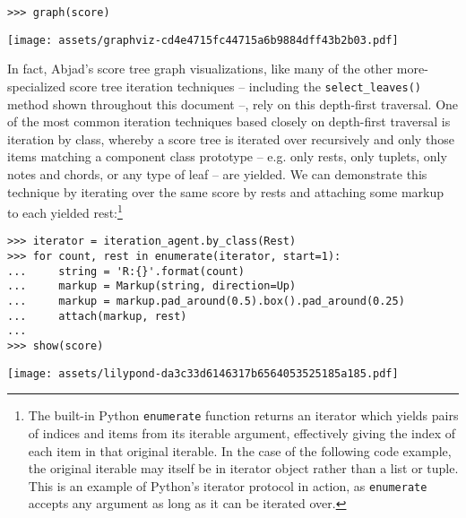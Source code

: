 \begin{comment}
<abjad>
graph(score)
</abjad>
\end{comment}

\begin{abjadbookoutput}
\begin{singlespacing}
\vspace{-0.5\baselineskip}
\begin{verbatim}
>>> graph(score)
\end{verbatim}
\noindent\texttt{[image: assets/graphviz-cd4e4715fc44715a6b9884dff43b2b03.pdf]}
\end{singlespacing}
\end{abjadbookoutput}

\noindent In fact, Abjad's score tree graph visualizations, like many of the
other more-specialized score tree iteration techniques -- including the
\texttt{select\_leaves()} method shown throughout this document --, rely on
this depth-first traversal. One of the most common iteration techniques based
closely on depth-first traversal is iteration by class, whereby a score tree is
iterated over recursively and only those items matching a component class
prototype -- e.g. only rests, only tuplets, only notes and chords, or any type
of leaf -- are yielded. We can demonstrate this technique by iterating over the
same score by rests and attaching some markup to each yielded rest:\footnote{
The built-in Python \texttt{enumerate} function returns an iterator which
yields pairs of indices and items from its iterable argument, effectively
giving the index of each item in that original iterable. In the case of the
following code example, the original iterable may itself be in iterator object
rather than a list or tuple. This is an example of Python's iterator protocol
in action, as \texttt{enumerate} accepts any argument as long as it can be
iterated over.}

\begin{comment}
<abjad>
iterator = iteration_agent.by_class(Rest)
for count, rest in enumerate(iterator, start=1):
    string = 'R:{}'.format(count)
    markup = Markup(string, direction=Up)
    markup = markup.pad_around(0.5).box().pad_around(0.25)
    attach(markup, rest)

show(score)
</abjad>
\end{comment}

\begin{abjadbookoutput}
\begin{singlespacing}
\vspace{-0.5\baselineskip}
\begin{verbatim}
>>> iterator = iteration_agent.by_class(Rest)
>>> for count, rest in enumerate(iterator, start=1):
...     string = 'R:{}'.format(count)
...     markup = Markup(string, direction=Up)
...     markup = markup.pad_around(0.5).box().pad_around(0.25)
...     attach(markup, rest)
...
>>> show(score)
\end{verbatim}
\noindent\texttt{[image: assets/lilypond-da3c33d6146317b6564053525185a185.pdf]}
\end{singlespacing}
\end{abjadbookoutput}

